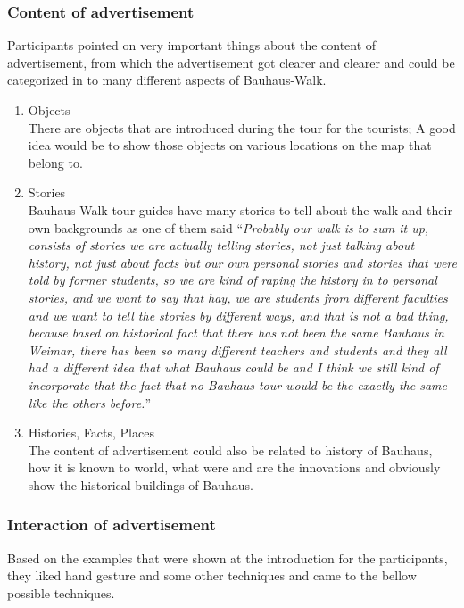 \subsubsection{Content of advertisement}
Participants pointed on very important things about the content of advertisement, from which the advertisement got clearer and clearer and could be categorized in to many different aspects of Bauhaus-Walk.


\begin {enumerate}

\item	Objects \\
There are objects that are introduced during the tour for the tourists; A good idea would be to show those objects on various locations on the map that belong to.
\item	Stories \\
Bauhaus Walk tour guides have many stories to tell about the walk and their own backgrounds as one of them said ``\emph{Probably our walk is to sum it up, consists of stories we are actually telling stories, not just talking about history, not just about facts but our own personal stories and stories that were told by former students, so we are kind of raping the history in to personal stories, and we want to say that hay, we are students from different faculties and we want to tell the stories by different ways, and that is not a bad thing, because based on historical fact that there has not been the same Bauhaus in Weimar, there has been so many different teachers and students and they all had a different idea that what Bauhaus could be and I think we still kind of incorporate that the fact that no Bauhaus tour would be the exactly the same like the others before.}''
\item	Histories, Facts, Places \\
The content of advertisement could also be related to history of Bauhaus, how it is known to world, what were and are the innovations and obviously show the historical buildings of Bauhaus.


\end{enumerate}

\subsubsection{Interaction of advertisement}
Based on the examples that were shown at the introduction for the participants, they liked hand gesture and some other techniques and came to the bellow possible techniques.


